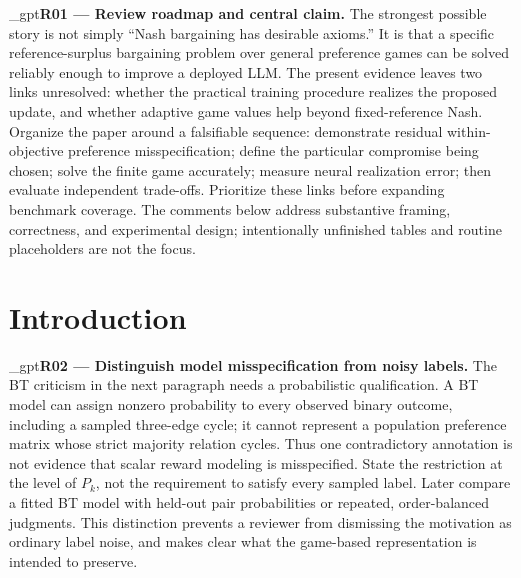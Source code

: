 \documentclass{article}
\makeatletter
\newif\ifshowreviews
\let\revieworiginalref\ref
\newcommand{\reviewref}[1]{%
  \@ifundefined{r@#1}{\textnormal{[original-draft ref.: \texttt{\detokenize{#1}}]}}%
  {\revieworiginalref{#1}}}
\let\ref\reviewref
\newcommand{\reviewresponse}[1]{%
  \ifshowreviews
  \par\begingroup\color{blue!65!black}\hypersetup{allcolors=blue!65!black}\emergencystretch=2em%
  \noindent\textbf{Response:} #1\par\endgroup
  \fi}
\theoremstyle{remark}
\theoremstyle{plain}
\makeatother
\begin{document}
\kekim_gpt{\textbf{R01 --- Review roadmap and central claim.} The strongest possible story is not simply ``Nash bargaining has desirable axioms.'' It is that a specific reference-surplus bargaining problem over general preference games can be solved reliably enough to improve a deployed LLM. The present evidence leaves two links unresolved: whether the practical training procedure realizes the proposed update, and whether adaptive game values help beyond fixed-reference Nash. Organize the paper around a falsifiable sequence: demonstrate residual within-objective preference misspecification; define the particular compromise being chosen; solve the finite game accurately; measure neural realization error; then evaluate independent trade-offs. Prioritize these links before expanding benchmark coverage. The comments below address substantive framing, correctness, and experimental design; intentionally unfinished tables and routine placeholders are not the focus.}
\reviewresponse{\textbf{R01 --- Partially addressed.} The experimental narrative separates generated-policy quality, compromise selection and adaptive opponents. Current external-baseline and cross-play measurements are retained. Tables~\ref{tab:target-transfer}--\ref{tab:projection-ablation} and Appendix~\ref{app:target-transfer} specify a development diagnostic of target quality and neural realization; its results remain pending.}


\section{Introduction}
\label{sec:intro}
\kekim_gpt{\textbf{R02 --- Distinguish model misspecification from noisy labels.} The BT criticism in the next paragraph needs a probabilistic qualification. A BT model can assign nonzero probability to every observed binary outcome, including a sampled three-edge cycle; it cannot represent a population preference matrix whose strict majority relation cycles. Thus one contradictory annotation is not evidence that scalar reward modeling is misspecified. State the restriction at the level of $P_k$, not the requirement to satisfy every sampled label. Later compare a fitted BT model with held-out pair probabilities or repeated, order-balanced judgments. This distinction prevents a reviewer from dismissing the motivation as ordinary label noise, and makes clear what the game-based representation is intended to preserve.}
\reviewresponse{\textbf{R02 --- Partially addressed.} The introduction distinguishes population misspecification from sampled label noise and identifies UF as a transitive-supervision comparison. The separate $60{,}000$-judgment audit resolves neither repeated-cycle excess nor a GPM predictive advantage. Acyclic constructed labels are not evidence that fresh preferences on the same prompts must be transitive.}
\end{document}

